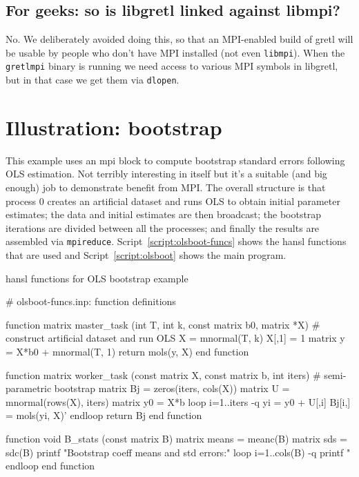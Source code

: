 \documentclass{article}
\begin{document}
\subsection{For geeks: so is libgretl linked against libmpi?}

No. We deliberately avoided doing this, so that an MPI-enabled build
of gretl will be usable by people who don't have MPI installed (not
even \texttt{libmpi}).  When the \texttt{gretlmpi} binary is
running we need access to various MPI symbols in libgretl, but in that
case we get them via \texttt{dlopen}.


\clearpage


\section{Illustration: bootstrap}
\label{sec:olsboot}

This example uses an mpi block to compute bootstrap standard errors
following OLS estimation. Not terribly interesting in itself but it's
a suitable (and big enough) job to demonstrate benefit from MPI.  The
overall structure is that process 0 creates an artificial dataset and
runs OLS to obtain initial parameter estimates; the data and initial
estimates are then broadcast; the bootstrap iterations are divided
between all the processes; and finally the results are assembled via
\texttt{mpireduce}.  Script~\ref{script:olsboot-funcs} shows the hansl
functions that are used and Script~\ref{script:olsboot} shows the main
program.

\begin{script}[htbp]
  \caption{hansl functions for OLS bootstrap example}
  \label{script:olsboot-funcs}
\begin{scode}
# olsboot-funcs.inp: function definitions

function matrix master_task (int T, int k, const matrix b0,
                             matrix *X)
  # construct artificial dataset and run OLS
  X = mnormal(T, k)
  X[,1] = 1
  matrix y = X*b0 + mnormal(T, 1)
  return mols(y, X)
end function

function matrix worker_task (const matrix X, const matrix b,
                             int iters)
  # semi-parametric bootstrap
  matrix Bj = zeros(iters, cols(X))		      
  matrix U = mnormal(rows(X), iters)
  matrix y0 = X*b
  loop i=1..iters -q
    yi = y0 + U[,i]  
    Bj[i,] = mols(yi, X)'
  endloop
  return Bj
end function

function void B_stats (const matrix B)
  matrix means = meanc(B)
  matrix sds = sdc(B)
  printf "Bootstrap coeff means and std errors:\n\n"
  loop i=1..cols(B) -q
    printf "%
  endloop
end function
\end{scode}
\end{script}
\end{document}
